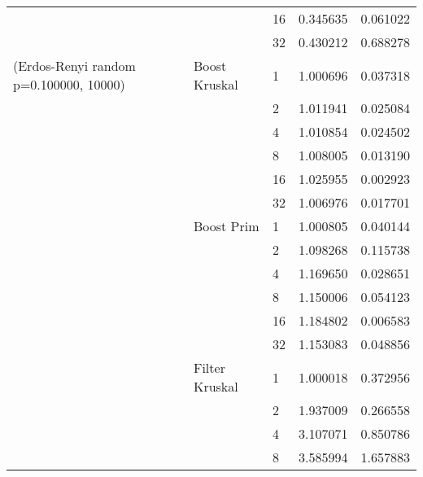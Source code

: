 \begin{tabular}{lllrr}
                                                       &                     & 16 &  0.345635 &  0.061022 \\
                                                       &                     & 32 &  0.430212 &  0.688278 \\
(Erdos-Renyi random p=0.100000, 10000) & Boost Kruskal & 1  &  1.000696 &  0.037318 \\
                                                       &                     & 2  &  1.011941 &  0.025084 \\
                                                       &                     & 4  &  1.010854 &  0.024502 \\
                                                       &                     & 8  &  1.008005 &  0.013190 \\
                                                       &                     & 16 &  1.025955 &  0.002923 \\
                                                       &                     & 32 &  1.006976 &  0.017701 \\
                                                       & Boost Prim & 1  &  1.000805 &  0.040144 \\
                                                       &                     & 2  &  1.098268 &  0.115738 \\
                                                       &                     & 4  &  1.169650 &  0.028651 \\
                                                       &                     & 8  &  1.150006 &  0.054123 \\
                                                       &                     & 16 &  1.184802 &  0.006583 \\
                                                       &                     & 32 &  1.153083 &  0.048856 \\
                                                       & Filter Kruskal & 1  &  1.000018 &  0.372956 \\
                                                       &                     & 2  &  1.937009 &  0.266558 \\
                                                       &                     & 4  &  3.107071 &  0.850786 \\
                                                       &                     & 8  &  3.585994 &  1.657883 \\

\end{tabular}
